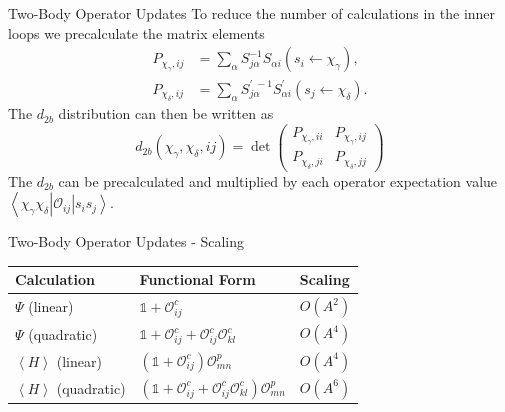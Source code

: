 \documentclass{beamer}
\newcommand{\ket}[1]{\left| #1 \right>}
\newcommand{\bra}[1]{\left< #1 \right|}
\begin{document}
\begin{frame}{Two-Body Operator Updates}
To reduce the number of calculations in the inner loops we precalculate the matrix elements
\begin{align*}
   P_{\chi_\gamma,ij} &=\sum_\alpha S^{-1}_{j\alpha}S_{\alpha i}(s_i\leftarrow \chi_\gamma), \\
   P_{\chi_\delta,ij} &=\sum_\alpha S^{\prime\;-1}_{j\alpha}S^\prime_{\alpha i}(s_j\leftarrow \chi_\delta).
\end{align*}
The $d_{2b}$ distribution can then be written as
\begin{equation*}
   d_{2b}(\chi_\gamma,\chi_\delta,ij)=\det\begin{pmatrix}P_{\chi_\gamma,ii} & P_{\chi_\gamma,ij} \\ P_{\chi_\delta,ji} & P_{\chi_\delta,jj}\end{pmatrix}
\end{equation*}
The $d_{2b}$ can be precalculated and multiplied by each operator expectation value $\bra{\chi_\gamma\chi_\delta}\mathcal{O}_{ij}\ket{s_is_j}$.
\end{frame}

\begin{frame}{Two-Body Operator Updates - Scaling}
\begin{table}[htb]
   \centering
   \begin{tabular}{|lll|}
      \hline
      Calculation & Functional Form & Scaling \\
      \hline
      $\Psi$ (linear)                              &  $\mathbb{1} + \mathcal{O}^c_{ij}$   &  $O(A^2)$ \\
      \hline
      $\Psi$ (quadratic)                           &  $\mathbb{1} + \mathcal{O}^c_{ij} + \mathcal{O}^c_{ij}\mathcal{O}^c_{kl}$   &  $O(A^4)$ \\
      \hline
      $\left<H\right>$ (linear)     &  $\left(\mathbb{1} + \mathcal{O}^c_{ij}\right)\mathcal{O}^p_{mn}$   &  $O(A^4)$ \\
      \hline
      $\left<H\right>$ (quadratic)  &  $\left(\mathbb{1} + \mathcal{O}^c_{ij} + \mathcal{O}^c_{ij}\mathcal{O}^c_{kl}\right)\mathcal{O}^p_{mn}$   &  $O(A^6)$ \\
      \hline
   \end{tabular}
\end{table}
\end{frame}
\end{document}
